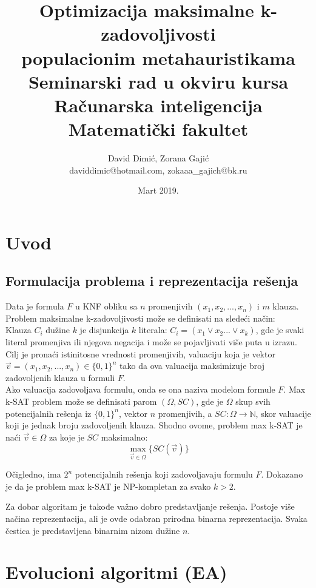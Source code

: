 \documentclass{article}
\title{Optimizacija maksimalne k-zadovoljivosti\\ populacionim metahauristikama\\ \small{Seminarski rad u okviru kursa\\ Računarska inteligencija\\ Matematički fakultet}}
\author{David Dimić, Zorana Gajić \\ daviddimic@hotmail.com, zokaaa\_gajich@bk.ru}
\date{Mart 2019.}
\begin{document}
\maketitle  
\tableofcontents
\newpage

\abstract{
}

\section{Uvod}
\label{sec:uvod}

\subsection{Formulacija problema  i reprezentacija rešenja}
\label{subsec:problem_resenje}

Data je formula $F$ u KNF obliku sa $n$ promenjivih $(x_1, x_2, ..., x_n)$ i $m$ klauza. Problem maksimalne k-zadovoljivosti može se definisati na sledeći način:\\ 

Klauza $C_i$ dužine $k$ je disjunkcija $k$ literala: 
$C_i = (x_1  \vee x_2 ... \vee x_k)$, gde je svaki literal promenjiva ili njegova negacija i može se pojavljivati više puta u izrazu.
Cilj je pronaći istinitosne vrednosti promenjivih, valuaciju koja je vektor $\vec{v} = (x_1, x_2, ..., x_n) \in \{ 0,1 \}^n$ tako da ova valuacija maksimizuje broj zadovoljenih klauza u formuli $F$.\\

Ako valuacija zadovoljava formulu, onda se ona naziva modelom formule $F$. Max k-SAT problem može se definisati parom $(\Omega, SC)$, gde je $\Omega$ skup svih potencijalnih rešenja iz $\{0,1\}^n$, vektor $n$ promenjivih, a $SC:\Omega \rightarrow \mathbb{N}$, skor valuacije koji je jednak broju zadovoljenih klauza. Shodno ovome, problem max k-SAT je naći $\vec{v} \in \Omega$ za koje je $SC$ maksimalno:\\
$$\max_{\vec{v} \in \Omega}\{SC(\vec{v})\}$$

Očigledno, ima $2^n$ potencijalnih rešenja koji zadovoljavaju formulu $F$. Dokazano je da je problem max k-SAT je NP-kompletan za svako $k>2$. %

Za dobar algoritam je takođe važno dobro predstavljanje rešenja. Postoje više načina reprezentacija, ali je ovde odabran prirodna binarna reprezentacija. Svaka čestica je predstavljena binarnim nizom dužine $n$.


\section{Evolucioni algoritmi (EA)}
\label{sec:ea}
\end{document}
